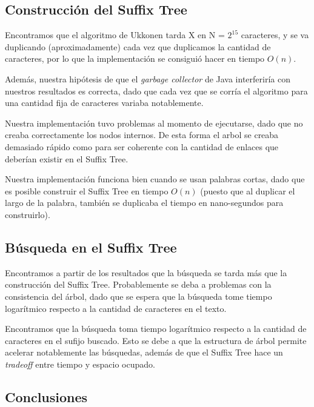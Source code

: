 \documentclass[letterpaper,10pt]{article}
\begin{document}
	\subsection{Construcción del Suffix Tree}


	Encontramos que el algoritmo de Ukkonen tarda X en N = $2^{15}$ caracteres, y se va duplicando (aproximadamente) cada vez que duplicamos la cantidad de caracteres, por lo que la
	implementación se consiguió hacer en tiempo $O(n)$.

	Además, nuestra hipótesis de que el \textit{garbage collector} de Java interferiría con nuestros resultados es correcta, dado que cada vez que se corría el algoritmo para una
	cantidad fija de caracteres variaba notablemente.

	Nuestra implementación tuvo problemas al momento de ejecutarse, dado que no creaba correctamente los nodos internos. De esta forma el arbol se creaba demasiado rápido como para
	ser coherente con la cantidad de enlaces que deberían existir en el Suffix Tree.

	Nuestra implementación funciona bien cuando se usan palabras cortas, dado que es posible construir el Suffix Tree en tiempo $O(n)$ (puesto que al duplicar el largo de la palabra,
	también se duplicaba el tiempo en nano-segundos para construirlo).

	\subsection{Búsqueda en el Suffix Tree}


	Encontramos a partir de los resultados que la búsqueda se tarda más que la construcción del Suffix Tree. Probablemente se deba a problemas con la consistencia del árbol, dado que
	se espera que la búsqueda tome tiempo logarítmico respecto a la cantidad de caracteres en el texto.

	Encontramos que la búsqueda toma tiempo logarítmico respecto a la cantidad de caracteres en el sufijo buscado. Esto se debe a que la estructura de árbol permite acelerar notablemente
	las búsquedas, además de que el Suffix Tree hace un \textit{tradeoff} entre tiempo y espacio ocupado.

	\subsection{Conclusiones}

\end{document}

